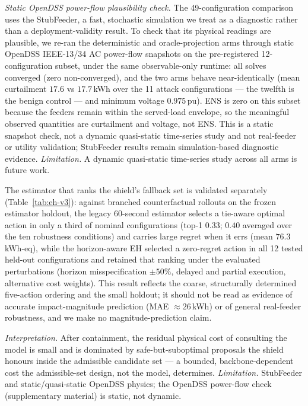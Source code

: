 \emph{Static OpenDSS power-flow plausibility check.} The 49-configuration
comparison uses the StubFeeder, a fast, stochastic simulation we treat as a
diagnostic rather than a deployment-validity result. To check that its physical
readings are plausible, we re-ran the deterministic and oracle-projection arms
through static OpenDSS IEEE-13/34 AC power-flow snapshots on the pre-registered
12-configuration subset, under the same observable-only runtime: all solves
converged (zero non-converged), and the two arms behave near-identically (mean
curtailment $17.6$ vs $17.7$\,kWh over the 11 attack configurations --- the
twelfth is the benign control --- and minimum voltage $0.975$\,pu). ENS is zero on
this subset because the feeders remain within the served-load envelope, so the
meaningful observed quantities are curtailment and voltage, not ENS. This is a
static snapshot check, not a dynamic quasi-static time-series study and not
real-feeder or utility validation; StubFeeder results remain simulation-based
diagnostic evidence. \emph{Limitation.} A dynamic quasi-static time-series study
across all arms is future work.

The estimator that ranks the shield's fallback set is validated separately
(Table~\ref{tab:eh-v3}): against branched counterfactual rollouts on the frozen
estimator holdout, the legacy 60-second estimator selects a tie-aware optimal
action in only a third of nominal configurations (top-1 $0.33$; $0.40$ averaged
over the ten robustness conditions) and carries large regret when it errs
(mean $76.3$\,kWh-eq), while the horizon-aware EH
selected a zero-regret action in all 12 tested held-out configurations and
retained that ranking under the evaluated perturbations (horizon misspecification
$\pm50\%$, delayed and partial execution, alternative cost weights). This result
reflects the coarse, structurally determined five-action ordering and the small
holdout; it should not be read as evidence of accurate impact-magnitude
prediction (MAE $\approx26$\,kWh) or of general real-feeder robustness, and we
make no magnitude-prediction claim.

\emph{Interpretation.} After containment, the residual physical cost of
consulting the model is small and is dominated by safe-but-suboptimal proposals
the shield honours inside the admissible candidate set --- a bounded, backbone-dependent cost the
admissible-set design, not the model, determines. \emph{Limitation.} StubFeeder and
static/quasi-static OpenDSS physics; the OpenDSS power-flow check
(supplementary material) is static, not dynamic.

